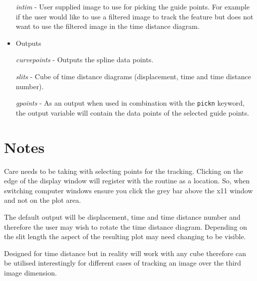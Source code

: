 \documentclass[11pt]{article}
\begin{document}
\begin{itemize}
\textit{intim} - User supplied image to use for picking the guide points. For example if the user would like to use a filtered image to track the feature but does not want to use the filtered image in the time distance diagram.

\item Outputs

\textit{curvepoints} - Outputs the spline data points.

\textit{slits} - Cube of time distance diagrams (displacement, time and time distance number).

\textit{gpoints} - As an output when used in combination with the \texttt{pickn} keyword, the output variable will contain the data points of the selected guide points.

\end{itemize}



\section{Notes}

Care needs to be taking with selecting points for the tracking. Clicking on the edge of the display window will register with the routine as a location. So, when switching computer windows ensure you click the grey bar above the x11 window and not on the plot area. 



The default output will be displacement, time and time distance number and therefore the user may wish to rotate the time distance diagram. Depending on the slit length the aspect of the resulting plot may need changing to be visible.



Designed for time distance but in reality will work with any cube therefore can be utilised interestingly for different cases of tracking an image over the third image dimension.
\end{document}
